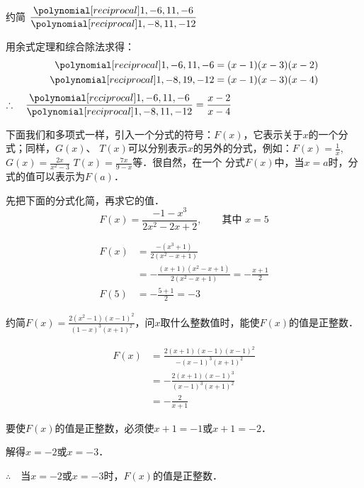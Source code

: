 \begin{example}
    约简 $\frac{\poly{1,-6,11,-6}}{\poly{1,-8,11,-12}}$  
\end{example}

\begin{solution}
用余式定理和综合除法求得：
\[\begin{split}
    \poly{1,-6,11,-6}&=(x-1)(x-3)(x-2)\\
    \poly{1,-8,19,-12}&=(x-1)(x-3)(x-4)
\end{split}\]
$\therefore\quad \frac{\poly{1,-6,11,-6}}{\poly{1,-8,11,-12}}=\frac{x-2}{x-4}$
\end{solution}

下面我们和多项式一样，引入一个分式的符号：$F(x)$，它表示关于$x$的一个分式；同样，$G(x)$、
$T(x)$可以分别表示$x$的另外的分式，例如：$F(x)=\frac{1}{x}$, $G(x)=\frac{2x}{x^2-3}$
$T (x) =\frac{7x}{9-x}$等．很自然，在一个
分式$F(x)$中，当$x=a$时，分式的值可以表示为$F (a)$．

\begin{example}
    先把下面的分式化简，再求它的值．
    \[F(x)=\frac{-1-x^3}{2x^2-2x+2},\qquad \text{其中 } x=5 \]
\end{example}
\begin{solution}
    \[\begin{split}
        F(x)&=\frac{-(x^3+1)}{2(x^2-x+1)}\\
&=-\frac{(x+1)(x^2-x+1)}{2(x^2-x+1)}=-\frac{x+1}{2}\\        
F(5)&=-\frac{5+1}{2}=-3
    \end{split}\]
\end{solution}

\begin{example}
    约简$F(x)=\frac{2(x^2-1)(x-1)^2}{(1-x)^3(x+1)^2}$，问$x$取什么整数值时，能使$F(x)$的值是正整数．
\end{example}

\begin{solution}
    \[\begin{split}
        F(x)&=\frac{2(x+1)(x-1)(x-1)^2}{-(x-1)^3 (x+1)^2}\\
        &=-\frac{2(x+1)(x-1)^3}{(x-1)^3(x+1)^2}\\
        &=-\frac{2}{x+1}
    \end{split}\]

    要使$F(x)$的值是正整数，必须使$x+1=-1$或$x+1=-2$．

    解得$x=-2$或$x=-3$．

    $\therefore\quad $当$x=-2$或$x=-3$时，$F(x)$的值是正整数．
\end{solution}

